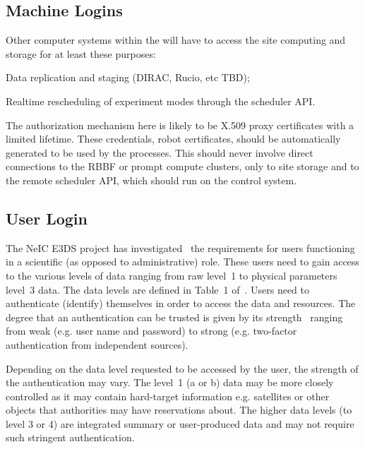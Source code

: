 \documentclass[12pt,a4paper]{article}
\begin{document}
\subsection{Machine Logins}

Other computer systems within the \ED \einfra will have to access the site computing and storage for at least these purposes:
\bitm
\item Data replication and staging (DIRAC, Rucio, etc TBD);
\item Realtime rescheduling of experiment modes through the scheduler API.
\eitm

The authorization mechanism here is likely to be X.509 proxy certificates with a limited lifetime.
These credentials, robot certificates, should be automatically generated to be used by the processes.
This should never involve direct connections to the RBBF or prompt compute clusters, only to site storage and to the remote scheduler API, which should run on the control system.



\subsection{User Login}
\label{sec:users}

The NeIC E3DS project has investigated~\cite{e3ds-md3}
the requirements for users functioning in a scientific (as opposed to administrative) role.
These users need to gain access to the various levels of \ED data ranging from raw level~1 to physical parameters level~3 data.
The \ED data levels are defined in Table~1 of~\cite{e3ds-md3}.
Users need to authenticate (identify) themselves in order to access the data and \einfra resources.
The degree that an authentication can be trusted is given by its strength~\cite{owasp-aai} ranging from weak (e.g. user name and password) to strong (e.g. two-factor authentication from independent sources).

Depending on the data level requested to be accessed by the \ED user, the strength of the authentication may vary.
The level~1 (a or b) data may be more closely controlled as it may contain hard-target information e.g. satellites or other objects that authorities may have reservations about.
The higher data levels (to level 3 or 4) are integrated summary or user-produced data and may not require such stringent authentication.
\end{document}

